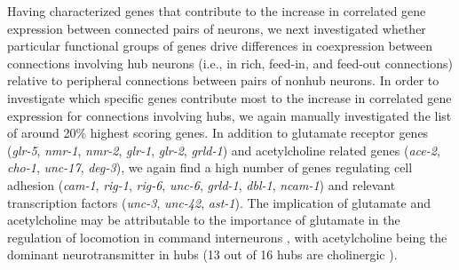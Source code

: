 \documentclass[10pt,letterpaper]{article}
\begin{document}
{ %
Having characterized genes that contribute to the increase in correlated gene expression between connected pairs of neurons, we next investigated whether particular functional groups of genes drive differences in coexpression between connections involving hub neurons (i.e., in rich, feed-in, and feed-out connections) relative to peripheral connections between pairs of nonhub neurons.
In order to investigate which specific genes contribute most to the increase in correlated gene expression for connections involving hubs, we again manually investigated the list of around 20\% highest scoring genes.
In addition to glutamate receptor genes (\emph{glr-5}, \emph{nmr-1}, \emph{nmr-2}, \emph{glr-1}, \emph{glr-2}, \emph{grld-1})
and acetylcholine related genes (\emph{ace-2}, \emph{cho-1}, \emph{unc-17}, \emph{deg-3}),
we again find a high number of genes regulating cell adhesion (\emph{cam-1}, \emph{rig-1}, \emph{rig-6}, \emph{unc-6}, \emph{grld-1}, \emph{dbl-1}, \emph{ncam-1})
and relevant transcription factors (\emph{unc-3}, \emph{unc-42}, \emph{ast-1}).
The implication of glutamate and acetylcholine may be attributable to the importance of glutamate in the regulation of locomotion in command interneurons \cite{Choi2015, Zheng1999}, with acetylcholine being the dominant neurotransmitter in hubs (13 out of 16 hubs are cholinergic \cite{Pereira:2015er}).
}
\end{document}
